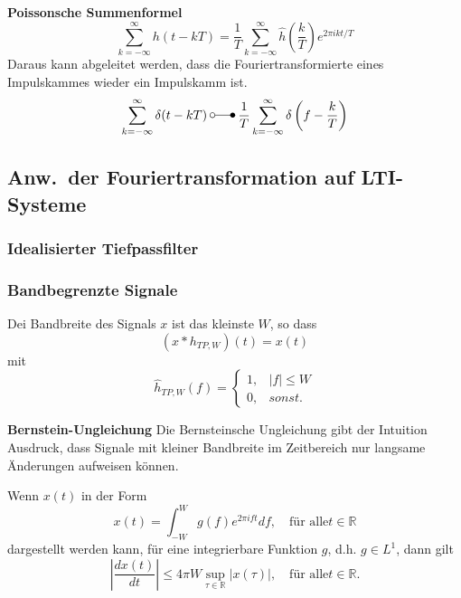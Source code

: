 \textbf{Poissonsche Summenformel}
\begin{equation*}
    \sum_{k=-\infty}^{\infty}h(t-kT)=\frac{1}{T}\sum_{k=-\infty}^{\infty}\hat{h}\left(\frac{k}{T}\right)e^{2\pi ikt/T}
\end{equation*}
Daraus kann abgeleitet werden, dass die Fouriertransformierte eines Impulskammes wieder ein Impulskamm ist.
\begin{equation*}
    \sum_{k=-\infty}^{\infty}\delta(t-kT) \: \laplace \: \frac{1}{T}\sum_{k=-\infty}^{\infty}\delta\left(f-\frac{k}{T}\right)
\end{equation*}

\subsection{Anw.\ der Fouriertransformation auf LTI-Systeme}

\subsubsection{Idealisierter Tiefpassfilter}

\subsubsection{Bandbegrenzte Signale}
Dei Bandbreite des Signals $x$ ist das kleinste $W$, so dass
\begin{equation*}
    (x*h_{TP,W})(t)=x(t)
\end{equation*}
mit
\begin{equation*}
    \hat{h}_{TP,W}(f)=
    \begin{cases}
        1, & |f| \leq W \\
        0, & sonst.
    \end{cases}
\end{equation*}

\textbf{Bernstein-Ungleichung}
Die Bernsteinsche Ungleichung gibt der Intuition Ausdruck, dass Signale mit kleiner
Bandbreite im Zeitbereich nur langsame Änderungen aufweisen können.

Wenn $x(t)$ in der Form
\begin{equation*}
    x(t)=\int_{-W}^{W}g(f)e^{2\pi ift}df,\quad\text{für alle}t\in\mathbb{R}
\end{equation*}
dargestellt werden kann, für eine integrierbare Funktion $g$, d.h. $g \in L^1$, dann gilt
\begin{equation*}
    \left|\frac{dx(t)}{dt}\right|\leq4\pi W\sup_{\tau\in\mathbb{R}}|x(\tau)|,\quad\text{für alle}t\in\mathbb{R}.
\end{equation*}